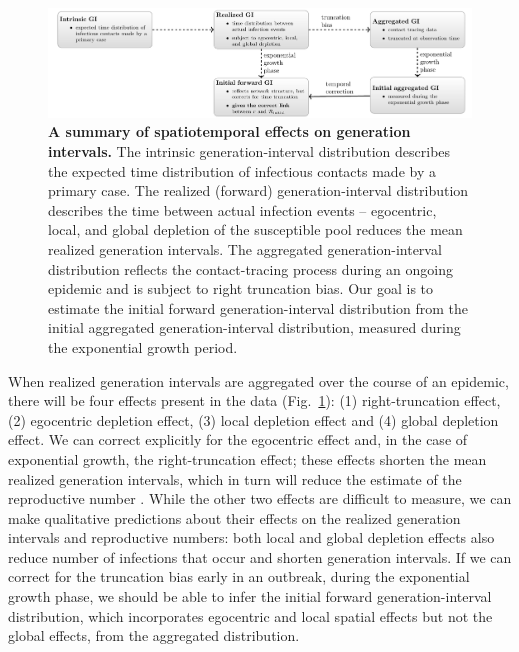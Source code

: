 \documentclass[12pt]{article}
\newcommand{\fref}[1]{Fig.~\ref{fig:#1}}
\begin{document}
\begin{figure}[!ht]
\includegraphics[width=\textwidth]{../fig/diagram.pdf}
\caption{
\textbf{A summary of spatiotemporal effects on generation intervals.}
The intrinsic generation-interval distribution describes the expected time distribution of infectious contacts made by a primary case.
The realized (forward) generation-interval distribution describes the time between actual infection events -- egocentric, local, and global depletion of the susceptible pool reduces the mean realized generation intervals.
The aggregated generation-interval distribution reflects the contact-tracing process during an ongoing epidemic and is subject to right truncation bias.
Our goal is to estimate the initial forward generation-interval distribution from the initial aggregated generation-interval distribution, measured during the exponential growth period.
}
\label{fig:diagram}
\end{figure}

When realized generation intervals are aggregated over the course of an epidemic, there will be four effects present in the data (\fref{diagram}): (1) right-truncation effect, (2) egocentric depletion effect, (3) local depletion effect and (4) global depletion effect.
We can correct explicitly for the egocentric effect and, in the case of exponential growth, the right-truncation effect;
these effects shorten the mean realized generation intervals, which in turn will reduce the estimate of the reproductive number \cite{wallinga2007generation, park2019practical}.
While the other two effects are difficult to measure, we can make qualitative predictions about their effects on the realized generation intervals and reproductive numbers: 
both local and global depletion effects also reduce number of infections that occur and shorten generation intervals.
If we can correct for the truncation bias early in an outbreak, during the exponential growth phase, we should be able to infer the initial forward generation-interval distribution, which incorporates egocentric and local spatial effects but not the global effects, from the aggregated distribution.
\end{document}
